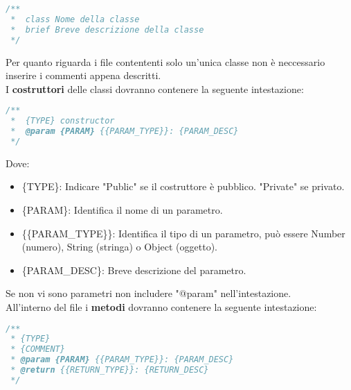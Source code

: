\begin{lstlisting}[language=JavaScript]
/**
 *  class Nome della classe
 *  brief Breve descrizione della classe
 */
\end{lstlisting}

Per quanto riguarda i file contententi solo un'unica classe non è neccessario inserire i commenti appena descritti.
\\



I \textbf{costruttori} delle classi dovranno contenere la seguente intestazione:

\begin{lstlisting}[language=JavaScript]
/**
 *  {TYPE} constructor
 *  @param {PARAM} {{PARAM_TYPE}}: {PARAM_DESC} 
 */
\end{lstlisting}
Dove:
\begin{itemize}
\item \{TYPE\}: Indicare "Public" se il costruttore è pubblico. "Private" se privato.
\item \{PARAM\}: Identifica il nome di un parametro.
\item \{\{PARAM\_TYPE\}\}: Identifica il tipo di un parametro, può essere Number (numero), String (stringa) o Object (oggetto).
\item \{PARAM\_DESC\}: Breve descrizione del parametro.
\end{itemize}
Se non vi sono parametri non includere "@param" nell'intestazione.
\\



All'interno del file i \textbf{metodi} dovranno contenere la seguente intestazione:

\begin{lstlisting}[language=JavaScript]
/**
 * {TYPE}
 * {COMMENT}
 * @param {PARAM} {{PARAM_TYPE}}: {PARAM_DESC}
 * @return {{RETURN_TYPE}}: {RETURN_DESC} 
 */
\end{lstlisting}

